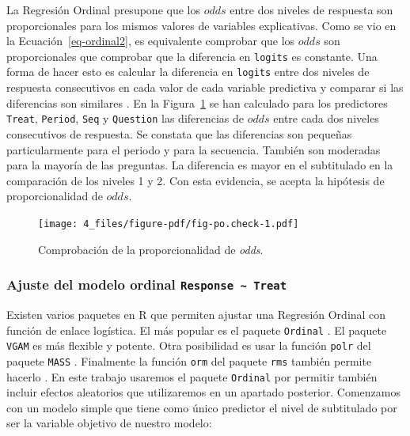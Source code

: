 \documentclass[
  12pt,
  a4paper,
  extrafontsizes,
  onecolumn,
  openright,
  table]{memoir}
\begin{document}
La Regresión Ordinal presupone que los \(odds\) entre dos niveles de
respuesta son proporcionales para los mismos valores de variables
explicativas. Como se vio en la Ecuación~\ref{eq-ordinal2}, es
equivalente comprobar que los \(odds\) son proporcionales que comprobar
que la diferencia en \texttt{logits} es constante. Una forma de hacer
esto es calcular la diferencia en \texttt{logits} entre dos niveles de
respuesta consecutivos en cada valor de cada variable predictiva y
comparar si las diferencias son similares
\autocite[ver][pp.~315-316]{harrell2015}. En la
Figura~\ref{fig-po.check} se han calculado para los predictores
\texttt{Treat}, \texttt{Period}, \texttt{Seq} y \texttt{Question} las
diferencias de \(odds\) entre cada dos niveles consecutivos de
respuesta. Se constata que las diferencias son pequeñas particularmente
para el periodo y para la secuencia. También son moderadas para la
mayoría de las preguntas. La diferencia es mayor en el subtitulado en la
comparación de los niveles 1 y 2. Con esta evidencia, se acepta la
hipótesis de proporcionalidad de \(odds\).

\begin{figure}[h]

{\centering \texttt{[image: 4\_files/figure-pdf/fig-po.check-1.pdf]}

}

\caption{\label{fig-po.check}Comprobación de la proporcionalidad de
\emph{odds}.}

\end{figure}

\hypertarget{ajuste-del-modelo-ordinal-response-treat}{%
\subsubsection{\texorpdfstring{Ajuste del modelo ordinal
\texttt{Response\ \textasciitilde{}\ Treat}}{Ajuste del modelo ordinal Response \textasciitilde{} Treat}}\label{ajuste-del-modelo-ordinal-response-treat}}

Existen varios paquetes en R que permiten ajustar una Regresión Ordinal
con función de enlace logística. El más popular es el paquete
\texttt{Ordinal} \autocite{ordinalR}. El paquete \texttt{VGAM}
\autocite{VGAMR} es más flexible y potente. Otra posibilidad es usar la
función \texttt{polr} del paquete \texttt{MASS} \autocite{MASSR}.
Finalmente la función \texttt{orm} del paquete \texttt{rms} también
permite hacerlo \autocite[ver][]{harrell2015}. En este trabajo usaremos
el paquete \texttt{Ordinal} por permitir también incluir efectos
aleatorios que utilizaremos en un apartado posterior. Comenzamos con un
modelo simple que tiene como único predictor el nivel de subtitulado por
ser la variable objetivo de nuestro modelo:
\end{document}
